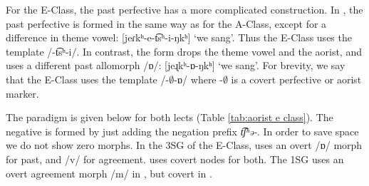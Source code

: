 \begin{table}
\caption{Past perfective  form of some A-Class verbs}\label{tab:Verb:Synthn:Aor:Example}
\end{table}


For the E-Class, the past perfective has a more complicated construction. In {\seaSE}, the past perfective is formed in the same way as for the A-Class, except for a difference in   theme vowel: [{{jeɾkʰ-e-t͡sʰ-i-ŋkʰ}}] `we sang'. Thus the {\seaSE} E-Class uses the template /-t͡sʰ-i/. In contrast, the {\iaIA} form drops the theme vowel and the aorist, and uses a different past allomorph /ɒ/: [{{jeɻkʰ-ɒ-ŋkʰ}}] `we sang'. For brevity, we say that the {\iaIA} E-Class uses the template /-$\emptyset$-ɒ/ where -$\emptyset$ is a covert perfective or aorist marker. 

The paradigm is given below for both lects (Table \ref{tab:aorist e class}). The negative is formed by just adding the negation prefix \textit{{t͡ʃʰə-}}. In order to save space we do not show zero morphs. 
 In the 3SG of the E-Class, {\iaIA} uses an overt /{ɒ}/ morph for past, and /{v}/ for agreement. {\seaSE} uses covert nodes for both. The 1SG uses an overt agreement morph /{m}/ in {\iaIA}, but covert in {\seaSE}.


